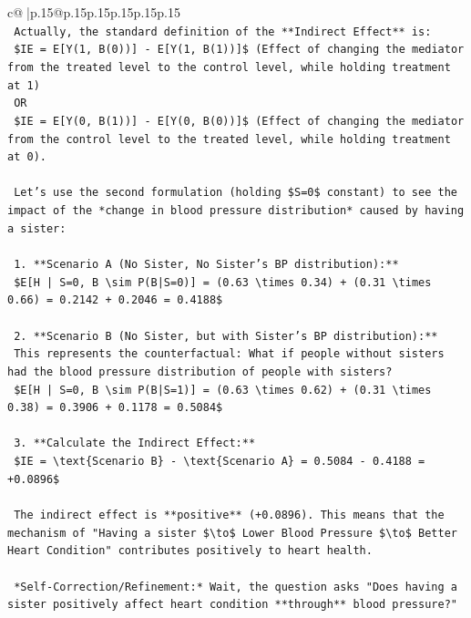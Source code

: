 \documentclass{article}
\begin{document}
{\begin{supertabular}{c@{$\;$}|p{.15\linewidth}@{}p{.15\linewidth}p{.15\linewidth}p{.15\linewidth}p{.15\linewidth}p{.15\linewidth}}
{{{\\ 
\texttt{    Actually, the standard definition of the **Indirect Effect** is:} \\
\texttt{    \$IE = E{[}Y(1, B(0)){]} {-} E{[}Y(1, B(1)){]}\$ (Effect of changing the mediator from the treated level to the control level, while holding treatment at 1)} \\
\texttt{    OR} \\
\texttt{    \$IE = E{[}Y(0, B(1)){]} {-} E{[}Y(0, B(0)){]}\$ (Effect of changing the mediator from the control level to the treated level, while holding treatment at 0).} \\
\\ 
\texttt{    Let's use the second formulation (holding \$S=0\$ constant) to see the impact of the *change in blood pressure distribution* caused by having a sister:} \\
\\ 
\texttt{    1.  **Scenario A (No Sister, No Sister's BP distribution):**} \\
\texttt{        \$E{[}H | S=0, B \textbackslash{}sim P(B|S=0){]} = (0.63 \textbackslash{}times 0.34) + (0.31 \textbackslash{}times 0.66) = 0.2142 + 0.2046 = 0.4188\$} \\
\\ 
\texttt{    2.  **Scenario B (No Sister, but with Sister's BP distribution):**} \\
\texttt{        This represents the counterfactual: What if people without sisters had the blood pressure distribution of people with sisters?} \\
\texttt{        \$E{[}H | S=0, B \textbackslash{}sim P(B|S=1){]} = (0.63 \textbackslash{}times 0.62) + (0.31 \textbackslash{}times 0.38) = 0.3906 + 0.1178 = 0.5084\$} \\
\\ 
\texttt{    3.  **Calculate the Indirect Effect:**} \\
\texttt{        \$IE = \textbackslash{}text\{Scenario B\} {-} \textbackslash{}text\{Scenario A\} = 0.5084 {-} 0.4188 = +0.0896\$} \\
\\ 
\texttt{    The indirect effect is **positive** (+0.0896). This means that the mechanism of "Having a sister \$\textbackslash{}to\$ Lower Blood Pressure \$\textbackslash{}to\$ Better Heart Condition" contributes positively to heart health.} \\
\\ 
\texttt{    *Self{-}Correction/Refinement:* Wait, the question asks "Does having a sister positively affect heart condition **through** blood pressure?"} \\
}}}
\end{supertabular}}
\end{document}
